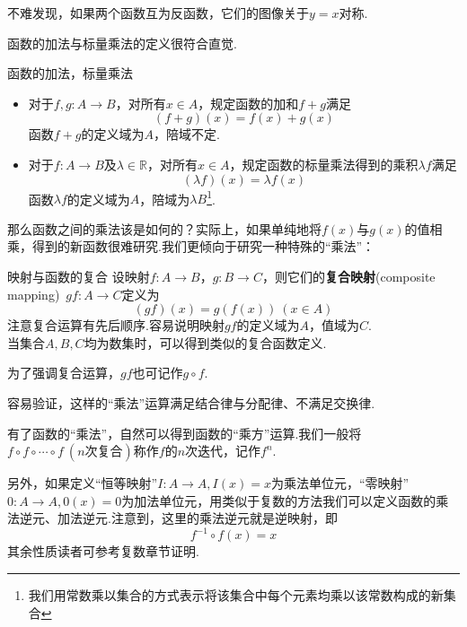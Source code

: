 \documentclass[lang=cn, zihao=5]{elegantbook}
\newcommand{\R}{\mathbb{R}}
\begin{document}
不难发现，如果两个函数互为反函数，它们的图像关于$y=x$对称.

函数的加法与标量乘法的定义很符合直觉.

\begin{definition}{函数的加法，标量乘法}
	\begin{itemize}
		\item 对于$f,g:A \to B$，对所有$x \in A$，规定函数的加和$f + g$满足$$(f + g)(x) = f(x) + g(x)$$
		函数$f + g$的定义域为$A$，陪域不定.
		\item 对于$f:A \to B$及$\lambda \in \R$，对所有$x \in A$，规定函数的标量乘法得到的乘积$\lambda f$满足$$(\lambda f)(x) = \lambda f(x)$$
		函数$\lambda f$的定义域为$A$，陪域为$\lambda B$\footnote{我们用常数乘以集合的方式表示将该集合中每个元素均乘以该常数构成的新集合}.
	\end{itemize}
\end{definition}

那么函数之间的乘法该是如何的？实际上，如果单纯地将$f(x)$与$g(x)$的值相乘，得到的新函数很难研究.我们更倾向于研究一种特殊的“乘法”：

\begin{definition}{映射与函数的复合} %
    设映射$f:A \to B$，$g:B \to C$，则它们的\textbf{复合映射}(composite mapping)~$gf:A \to C$定义为$$(gf)(x)=g(f(x)) \ (x \in A)$$
    注意复合运算有先后顺序.容易说明映射$gf$的定义域为$A$，值域为$C$.\\
    当集合$A,B,C$均为数集时，可以得到类似的复合函数定义.
\end{definition}
\begin{remark}
	为了强调复合运算，$gf$也可记作$g \circ f$.
\end{remark}

容易验证，这样的“乘法”运算满足结合律与分配律、不满足交换律.

有了函数的“乘法”，自然可以得到函数的“乘方”运算.我们一般将$f \circ f \circ \cdots \circ f~(n\textit{次复合})$称作$f$的$n$次迭代，记作$f^n$.

另外，如果定义“恒等映射”$I:A \to A,I(x)=x$为乘法单位元，“零映射”$0:A\to A,0(x)=0$为加法单位元，用类似于复数的方法我们可以定义函数的乘法逆元、加法逆元.注意到，这里的乘法逆元就是逆映射，即$$f^{-1} \circ f (x) = x$$
其余性质读者可参考复数章节证明.
\end{document}
